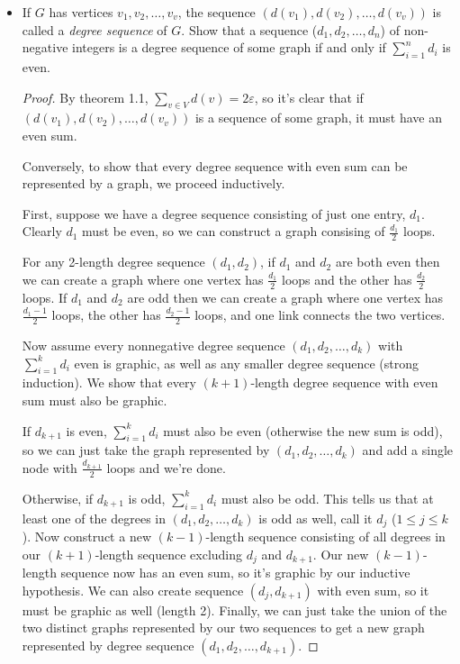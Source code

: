 \documentclass[11pt]{article}
\newcommand\itm[1]{\item[\textbf{#1}]}
\newcommand{\n}{\vspace{0.5cm}}
\begin{document}
\begin{itemize}
\begin{proof}
        In conclusion, for any \(k\)-cube, two vertices cannot be adjacent to the same 3 vertices, meaning that the above bipartite graph cannot be a subgraph of any \(k\)-cube.
      \end{proof}



  \itm{1.5.5} If \(G\) has vertices \(v_1, v_2, \hdots, v_v\), the sequence \((d(v_1), d(v_2), \hdots, d(v_v))\) is called a \textit{degree sequence} of \(G\).  Show that a sequence (\(d_1, d_2, \hdots, d_n\)) of non-negative integers is a degree sequence of some graph if and only if \(\displaystyle \sum_{i=1}^n d_i\) is even.
    \begin{proof}
      By theorem 1.1, \(\displaystyle\sum_{v \in V} d(v) = 2\varepsilon\), so it's clear that if \((d(v_1), d(v_2), \hdots, d(v_v))\) is a sequence of some graph, it must have an even sum. \n

      Conversely, to show that every degree sequence with even sum can be represented by a graph, we proceed inductively.

      First, suppose we have a degree sequence consisting of just one entry, \(d_1\).  Clearly \(d_1\) must be even, so we can construct a graph consising of \(\displaystyle\frac{d_1}{2}\) loops.

      For any 2-length degree sequence \((d_1,d_2)\), if \(d_1\) and \(d_2\) are both even then we can create a graph where one vertex has \(\displaystyle\frac{d_1}{2}\) loops and the other has \(\displaystyle\frac{d_2}{2}\) loops.  If \(d_1\) and \(d_2\) are odd then we can create a graph where one vertex has \(\displaystyle\frac{d_1-1}{2}\) loops, the other has \(\displaystyle\frac{d_2-1}{2}\) loops, and one link connects the two vertices.

      Now assume every nonnegative degree sequence \((d_1,d_2,\hdots,d_k)\) with \(\displaystyle\sum_{i=1}^{k}d_i\) even is graphic, as well as any smaller degree sequence (strong induction).  We show that every \((k+1)\)-length degree sequence with even sum must also be graphic.

      If \(d_{k+1}\) is even, \(\displaystyle\sum_{i=1}^{k}d_i\) must also be even (otherwise the new sum is odd), so we can just take the graph represented by \((d_1,d_2,\hdots,d_k)\) and add a single node with \(\displaystyle\frac{d_{k+1}}{2}\) loops and we're done.

      Otherwise, if \(d_{k+1}\) is odd, \(\displaystyle\sum_{i=1}^{k}d_i\) must also be odd.  This tells us that at least one of the degrees in \((d_1,d_2,\hdots,d_k)\) is odd as well, call it \(d_j\) (\(1 \leq j \leq k\)).  Now construct a new \((k-1)\)-length sequence consisting of all degrees in our \((k+1)\)-length sequence excluding \(d_j\) and \(d_{k+1}\).  Our new \((k-1)\)-length sequence now has an even sum, so it's graphic by our inductive hypothesis.  We can also create sequence \((d_j, d_{k+1})\) with even sum, so it must be graphic as well (length 2).  Finally, we can just take the union of the two distinct graphs represented by our two sequences to get a new graph represented by degree sequence \((d_1,d_2,\hdots,d_{k+1})\). \n


\end{proof}
\end{itemize}
\end{document}
